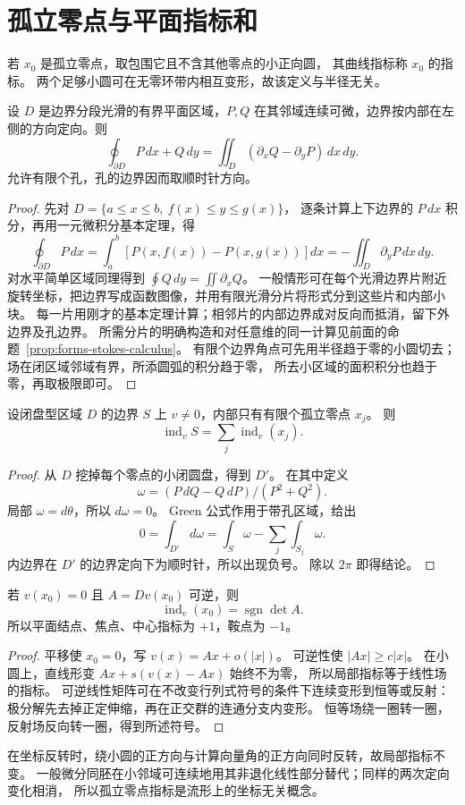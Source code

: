 \section{孤立零点与平面指标和}
\begin{definition}
若 $x_0$ 是孤立零点，取包围它且不含其他零点的小正向圆，
其曲线指标称 $x_0$ 的指标。
两个足够小圆可在无零环带内相互变形，故该定义与半径无关。
\end{definition}

\begin{lemma}[平面 Green 公式]\label{lem:green-from-calculus}
设 $D$ 是边界分段光滑的有界平面区域，$P,Q$ 在其邻域连续可微，边界按内部在左侧的方向定向。则
\[
 \oint_{\partial D}P\,dx+Q\,dy
 =\iint_D(\partial_xQ-\partial_yP)\,dx\,dy.
\]
允许有限个孔，孔的边界因而取顺时针方向。
\end{lemma}
\begin{proof}
先对 $D=\{a\leq x\leq b,\ f(x)\leq y\leq g(x)\}$，
逐条计算上下边界的 $P\,dx$ 积分，再用一元微积分基本定理，得
\[
 \oint_{\partial D}P\,dx
 =\int_a^b[P(x,f(x))-P(x,g(x))]dx
 =-\iint_D\partial_yP\,dx\,dy.
\]
对水平简单区域同理得到 $\displaystyle\oint Q\,dy=\displaystyle\iint\partial_xQ$。
一般情形可在每个光滑边界片附近旋转坐标，把边界写成函数图像，并用有限光滑分片将形式分到这些片和内部小块。
每一片用刚才的基本定理计算；相邻片的内部边界成对反向而抵消，留下外边界及孔边界。
所需分片的明确构造和对任意维的同一计算见前面的命题~\ref{prop:forms-stokes-calculus}。
有限个边界角点可先用半径趋于零的小圆切去；场在闭区域邻域有界，所添圆弧的积分趋于零，
所去小区域的面积积分也趋于零，再取极限即可。
\end{proof}

\begin{theorem}[平面指标和]\label{thm:arnold-indexsum-plane}
设闭盘型区域 $D$ 的边界 $S$ 上 $v\ne0$，内部只有有限个孤立零点 $x_j$。
则
\[
 \operatorname{ind}_v S=\sum_j\operatorname{ind}_v(x_j).
\]
\end{theorem}
\begin{proof}
从 $D$ 挖掉每个零点的小闭圆盘，得到 $D'$。
在其中定义
\[
 \omega=(P\,dQ-Q\,dP)/(P^2+Q^2).
\]
局部 $\omega=d\theta$，所以 $d\omega=0$。
Green 公式作用于带孔区域，给出
\[
 0=\int_{D'}d\omega=\int_S\omega-\sum_j\int_{S_j}\omega.
\]
内边界在 $D'$ 的边界定向下为顺时针，所以出现负号。
除以 $2\pi$ 即得结论。
\end{proof}
\begin{proposition}[非退化零点]
若 $v(x_0)=0$ 且 $A=Dv(x_0)$ 可逆，则
\[
 \operatorname{ind}_v(x_0)=\operatorname{sgn}\det A.
\]
所以平面结点、焦点、中心指标为 $+1$，鞍点为 $-1$。
\end{proposition}
\begin{proof}
平移使 $x_0=0$，写 $v(x)=Ax+o(|x|)$。
可逆性使 $|Ax|\geq c|x|$。
在小圆上，直线形变 $Ax+s(v(x)-Ax)$ 始终不为零，
所以局部指标等于线性场的指标。
可逆线性矩阵可在不改变行列式符号的条件下连续变形到恒等或反射：
极分解先去掉正定伸缩，再在正交群的连通分支内变形。
恒等场绕一圈转一圈，反射场反向转一圈，得到所述符号。
\end{proof}
在坐标反转时，绕小圆的正方向与计算向量角的正方向同时反转，故局部指标不变。
一般微分同胚在小邻域可连续地用其非退化线性部分替代；同样的两次定向变化相消，
所以孤立零点指标是流形上的坐标无关概念。


